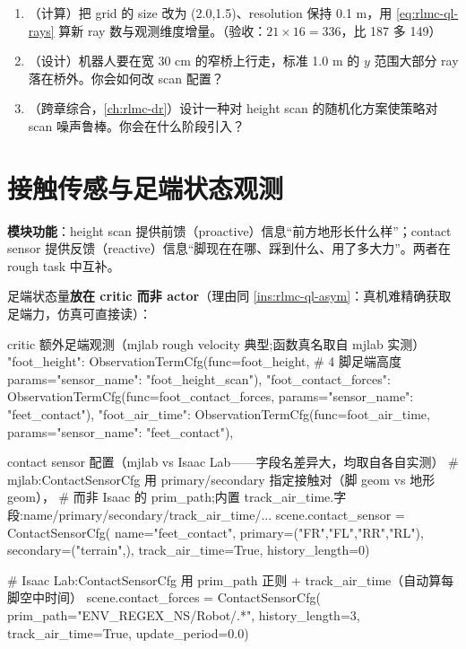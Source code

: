 \begin{practice}[地形与扫描]
\begin{enumerate}
\item （计算）把 grid 的 size 改为 (2.0,1.5)、resolution 保持 0.1 m，用 \eqref{eq:rlmc-ql-rays} 算新 ray 数与观测维度增量。（验收：$21\times 16=336$，比 187 多 149）
\item （设计）机器人要在宽 30 cm 的窄桥上行走，标准 1.0 m 的 $y$ 范围大部分 ray 落在桥外。你会如何改 scan 配置？
\item （跨章综合，\cref{ch:rlmc-dr}）设计一种对 height scan 的随机化方案使策略对 scan 噪声鲁棒。你会在什么阶段引入？
\end{enumerate}
\end{practice}

\section{接触传感与足端状态观测}
\label{sec:rlmc-ql-contact}

\textbf{模块功能}：height scan 提供前馈（proactive）信息“前方地形长什么样”；contact sensor 提供反馈（reactive）信息“脚现在在哪、踩到什么、用了多大力”。两者在 rough task 中互补。

足端状态量\textbf{放在 critic 而非 actor}（理由同 \cref{ins:rlmc-ql-asym}：真机难精确获取足端力，仿真可直接读）：

\begin{codebox}[Python]{critic 额外足端观测（mjlab rough velocity 典型;函数真名取自 mjlab 实测）}
"foot_height":         ObservationTermCfg(func=foot_height,           # 4 脚足端高度
                               params={"sensor_name": "foot_height_scan"}),
"foot_contact_forces": ObservationTermCfg(func=foot_contact_forces,
                               params={"sensor_name": "feet_contact"}),
"foot_air_time":       ObservationTermCfg(func=foot_air_time,
                               params={"sensor_name": "feet_contact"}),
\end{codebox}

\begin{codebox}[Python]{contact sensor 配置（mjlab vs Isaac Lab——字段名差异大，均取自各自实测）}
# mjlab:ContactSensorCfg 用 primary/secondary 指定接触对（脚 geom vs 地形 geom），
#   而非 Isaac 的 prim_path;内置 track_air_time.字段:name/primary/secondary/track_air_time/...
scene.contact_sensor = ContactSensorCfg(
    name="feet_contact", primary=("FR","FL","RR","RL"), secondary=("terrain",),
    track_air_time=True, history_length=0)

# Isaac Lab:ContactSensorCfg 用 prim_path 正则 + track_air_time（自动算每脚空中时间）
scene.contact_forces = ContactSensorCfg(
    prim_path="{ENV_REGEX_NS}/Robot/.*",
    history_length=3, track_air_time=True, update_period=0.0)
\end{codebox}

